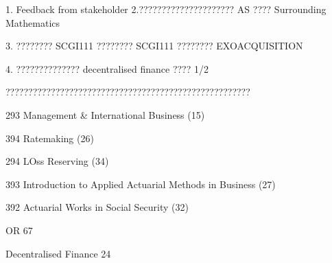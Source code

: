1. Feedback from stakeholder
2.????????????????????? AS ???? Surrounding Mathematics

3. ???????? SCGI111
????????	SCGI111	????????	EXOACQUISITION

4. ?????????????? decentralised finance ???? 1/2


?????????????????????????????????????????????????????? 

293 Management & International Business (15)

394 Ratemaking (26)

294 LOss Reserving (34)

393 Introduction to Applied Actuarial Methods in Business (27)

392 Actuarial Works in Social Security (32)

OR 67

Decentralised Finance 24